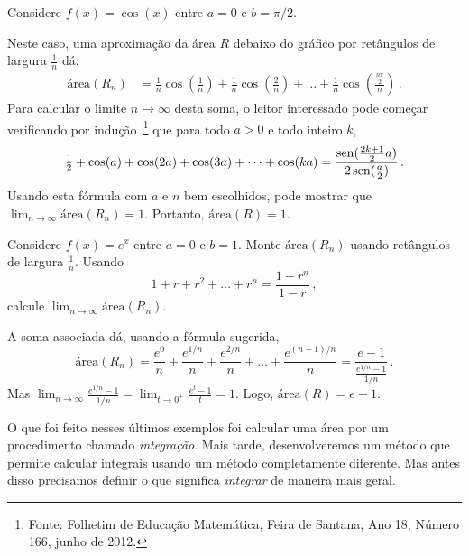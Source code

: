 \begin{ex}
Considere $f(x)=\cos(x)$ entre $a=0$ e $b=\pi/2$.
\begin{center}
\begin{bmlimage}\end{bmlimage}
\end{center}
Neste caso, uma aproximação da área $R$ debaixo do gráfico por 
retângulos de largura $\tfrac1n$ dá:
\begin{align}
\text{área}(R_n)&=\tfrac1n\cos(\tfrac{1}{n})
+\tfrac1n\cos(\tfrac{2}{n})+\dots
+\tfrac1n\cos(\tfrac{\frac{n\pi}{2}}{n})\,.
\end{align}
Para calcular o limite $n\to\infty$ desta soma, o leitor interessado 
pode começar verificando por indução~\footnote{Fonte: Folhetim de
Educação Matemática, Feira de Santana, Ano 18, Número 166, junho de
2012.} que para todo $a>0$ e todo inteiro $k$,
\[
\tfrac12+\cos(a)+\cos(2a)+\cos(3a)+\dots+\cos(ka)=\frac{\operatorname{sen}(\frac{2k+1}{2}a)}{2\operatorname{sen}(\frac{a}{2})}\,.
\]
Usando esta fórmula com $a$ e $n$ bem escolhidos, pode 
mostrar que  $\lim_{n\to \infty}\text{área}(R_n)=1$. Portanto,
$\text{área}(R)=1$.
\end{ex}

\begin{exo}
Considere $f(x)=e^x$ entre $a=0$ e $b=1$.
Monte $\text{área}(R_n)$ usando retângulos de largura $\tfrac1n$.
Usando
\[
1+r+r^2+\dots+r^n=\frac{1-r^n}{1-r}\,,
\]
calcule $\lim_{n\to\infty}\text{área}(R_n)$.
\begin{sol}
A soma associada dá, usando a fórmula sugerida,
\[
\text{área}(R_n)=\frac{e^0}{n}+\frac{e^{1/n}}{n}
+\frac{e^{2/n}}{n}+\dots+\frac{e^{(n-1)/n}}{n}
=\frac{e-1}{\frac{e^{1/n}-1}{1/n}}\,.
\]
Mas $\lim_{n\to\infty}\frac{e^{1/n}-1}{1/n}=\lim_{t\to
0^+}\frac{e^t-1}{t}=1$. Logo,
$\text{área}(R)=e-1$.
\end{sol}
\end{exo}

O que foi feito nesses últimos exemplos foi calcular uma área por um
procedimento chamado \emph{integração}. 
Mais tarde, desenvolveremos um método que permite calcular
integrais usando um método completamente diferente. Mas
antes disso precisamos definir o que significa \emph{integrar} de
maneira mais geral.

